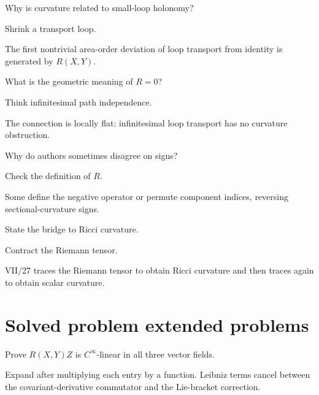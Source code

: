 \begin{exercise}\label{exr:vii26-21}
Why is curvature related to small-loop holonomy?
\end{exercise}
\begin{hint}
Shrink a transport loop.
\end{hint}
\begin{solution}
The first nontrivial area-order deviation of loop transport from identity is generated by \(R(X,Y)\).
\end{solution}

\begin{exercise}\label{exr:vii26-22}
What is the geometric meaning of \(R=0\)?
\end{exercise}
\begin{hint}
Think infinitesimal path independence.
\end{hint}
\begin{solution}
The connection is locally flat: infinitesimal loop transport has no curvature obstruction.
\end{solution}

\begin{exercise}\label{exr:vii26-23}
Why do authors sometimes disagree on signs?
\end{exercise}
\begin{hint}
Check the definition of \(R\).
\end{hint}
\begin{solution}
Some define the negative operator or permute component indices, reversing sectional-curvature signs.
\end{solution}

\begin{exercise}\label{exr:vii26-24}
State the bridge to Ricci curvature.
\end{exercise}
\begin{hint}
Contract the Riemann tensor.
\end{hint}
\begin{solution}
VII/27 traces the Riemann tensor to obtain Ricci curvature and then traces again to obtain scalar curvature.
\end{solution}

\section{Solved problem extended problems}
\begin{problem}\label{prob:vii26-01}
Prove \(R(X,Y)Z\) is \(C^\infty\)-linear in all three vector fields.
\end{problem}
\begin{solution}
Expand after multiplying each entry by a function. Leibniz terms cancel between the covariant-derivative commutator and the Lie-bracket correction.
\end{solution}


